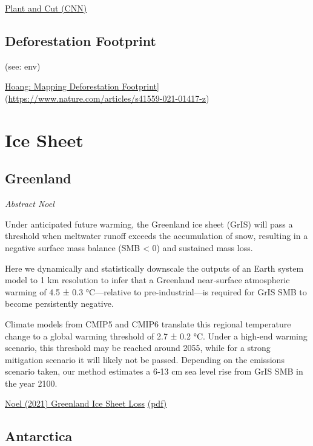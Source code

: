 \documentclass[
]{book}
\begin{document}
\href{https://edition.cnn.com/2021/02/10/opinions/climate-plant-and-cut-trees-down-bader/index.html}{Plant and Cut (CNN)}

\hypertarget{deforestation-footprint}{%
\section{Deforestation Footprint}\label{deforestation-footprint}}

(see: env)

\href{Nature,\%20paywall}{Hoang: Mapping Deforestation Footprint}{]}(\url{https://www.nature.com/articles/s41559-021-01417-z})

\hypertarget{ice-sheet}{%
\chapter{Ice Sheet}\label{ice-sheet}}

\hypertarget{greenland}{%
\section{Greenland}\label{greenland}}

\emph{Abstract Noel}

Under anticipated future warming, the Greenland ice sheet (GrIS) will
pass a threshold when meltwater runoff exceeds the accumulation of snow,
resulting in a negative surface mass balance (SMB \textless{} 0) and sustained mass loss.

Here we dynamically and statistically downscale the outputs of an
Earth system model to 1 km resolution to infer that a Greenland near‐surface
atmospheric warming of 4.5 ± 0.3 °C---relative to pre‐industrial---is required
for GrIS SMB to become persistently negative.

Climate models from CMIP5 and CMIP6 translate this regional temperature change
to a global warming threshold of 2.7 ± 0.2 °C.
Under a high‐end warming scenario, this threshold may be reached around 2055,
while for a strong mitigation scenario it will likely not be passed.
Depending on the emissions scenario taken, our method estimates a 6‐13 cm sea level rise
from GrIS SMB in the year 2100.

\href{https://agupubs.onlinelibrary.wiley.com/doi/10.1029/2020GL090471}{Noel (2021) Greenland Ice Sheet Loss}
\href{pdf/Noel_2021_Greenland_Ice_Sheet_Loss.pdf}{(pdf)}

\hypertarget{antarctica}{%
\section{Antarctica}\label{antarctica}}
\end{document}
